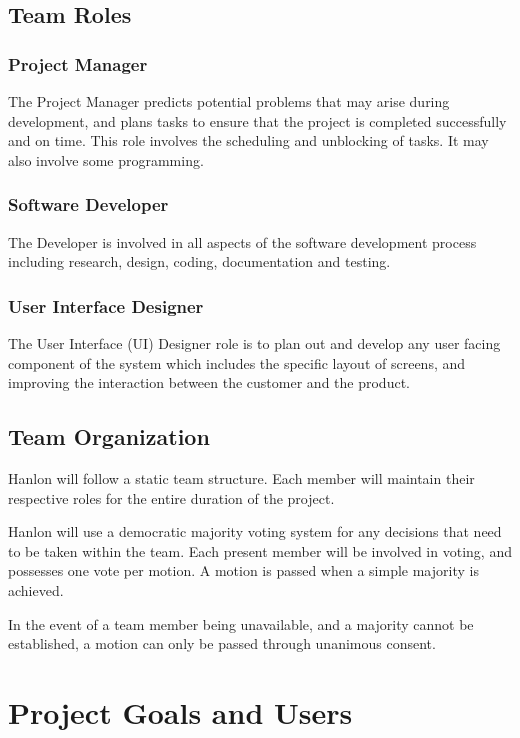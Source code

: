 \documentclass[12pt,letterpaper]{article}
\begin{document}
\subsection{Team Roles}
\subsubsection*{Project Manager}
The Project Manager predicts potential problems that may arise during development, and plans tasks to ensure that the project is completed successfully and on time. This role involves the scheduling and unblocking of tasks. It may also involve some programming.

\subsubsection*{Software Developer}
The Developer is involved in all aspects of the software development process including research, design, coding, documentation and testing.

\subsubsection*{User Interface Designer}
The User Interface (UI) Designer role is to plan out and develop any user facing component of the system which includes the specific layout of screens, and improving the interaction between the customer and the product.

\subsection{Team Organization}
Hanlon will follow a static team structure. Each member will maintain their respective roles for the entire duration of the project. \par

Hanlon will use a democratic majority voting system for any decisions that need to be taken within the team. Each present member will be involved in voting, and possesses one vote per motion. A motion is passed when a simple majority is achieved. \par

In the event of a team member being unavailable, and a majority cannot be established, a motion can only be passed through unanimous consent.

\clearpage
\section{Project Goals and Users}
\end{document}
